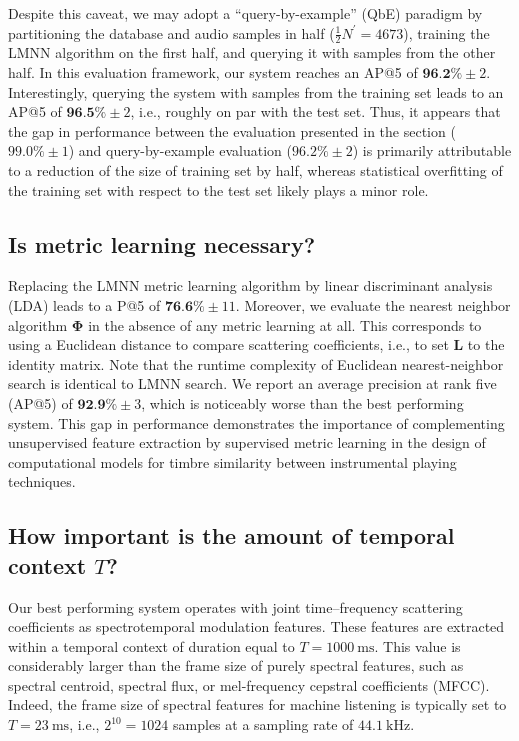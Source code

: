 \documentclass{bmcart}
\newcommand{\ja}[1]{\textcolor{purple}{JA: #1}\xspace}
\newcommand{\lnameref}[1]{%
\bgroup
\let\nmu\MakeLowercase
\nameref{#1}\egroup}
\newcommand{\nmu}{}
\begin{document}
Despite this caveat, we may adopt a ``query-by-example'' (QbE) paradigm by  partitioning the database and audio samples in half ($\frac{1}{2}N^{\prime}=4673$), training the LMNN algorithm on the first half, and querying it with samples from the other half.
In this evaluation framework, our system reaches an AP@5 of $\textbf{96.2\%} \pm 2$.
Interestingly, querying the system with samples from the training set leads to an AP@5 of $\textbf{96.5\%} \pm 2$, i.e., roughly on par with the test set.
Thus, it appears that the gap in performance between the evaluation presented in the \lnameref{sec:results} section ($99.0\%\pm 1$) and query-by-example evaluation ($96.2\% \pm 2$) is primarily attributable to a reduction of the size of training set by half, whereas statistical overfitting of the training set with respect to the test set likely plays a minor role.


\subsection*{Is metric learning necessary?}
Replacing the LMNN metric learning algorithm by linear discriminant analysis (LDA) leads to a P@5 of $\textbf{76.6}\% \pm 11$.
Moreover, we evaluate the nearest neighbor algorithm $\mathbf{\Phi}$ in the absence of any metric learning at all. %
This corresponds to using a Euclidean distance to compare scattering coefficients, i.e., to set $\mathbf{L}$ to the identity matrix.
Note that the runtime complexity of Euclidean nearest-neighbor search is identical to LMNN search. %
We report an average precision at rank five (AP@5) of $\textbf{92.9\%} \pm 3$, which is noticeably worse than the best performing system.
This gap in performance demonstrates the importance of complementing unsupervised feature extraction by supervised metric learning in the design  of computational models for timbre similarity between instrumental playing techniques.

\subsection*{How important is the amount of temporal context $T$?}

Our best performing system operates with joint time--frequency scattering coefficients as spectrotemporal modulation features.
These features are extracted within a temporal context of duration equal to $T=\SI{1000}{\milli\second}$.
This value is considerably larger than the frame size of purely spectral features, such as spectral centroid, spectral flux, or mel-frequency cepstral coefficients (MFCC).
Indeed, the frame size of spectral features for machine listening is typically set to $T=\SI{23}{\milli\second}$, i.e., $2^{10}=1024$ samples at a sampling rate of $\SI{44,1}{\kilo\hertz}$.
\end{document}

